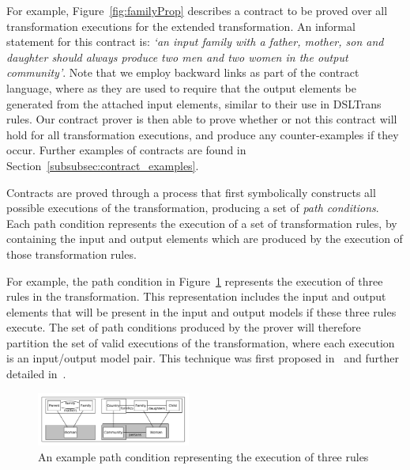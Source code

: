   For example, Figure~\ref{fig:familyProp} describes a contract to be proved over all transformation executions for the extended \FTP transformation. An informal statement for this contract is:
  \textit{`an input family with a father, mother, son and daughter should always produce
  two men and two women in the output community'}. Note that we employ backward links as part of the contract language, where as they are used to require that the output elements be
  generated from the attached input elements, similar to their use in DSLTrans rules. Our contract prover is then
  able to prove whether or not this contract will hold for all transformation executions, and produce any counter-examples if they occur. Further examples of contracts are found in Section~\ref{subsubsec:contract_examples}.


 Contracts are proved through a process that first symbolically constructs all
 possible executions of the transformation, producing a set of \emph{path conditions}. Each path condition represents the execution of a set of transformation rules, by containing the input and output elements which are produced by the execution of those transformation rules.

 For example, the path condition in Figure~\ref{fig:pc_first} represents the execution of three rules in the transformation. This representation includes the input and output elements that will be present in the input and output models if these three rules execute. The set of path conditions produced by the prover will therefore partition the set of valid executions of the transformation, where each execution is an input/output model pair. This technique was first proposed in~\cite{Lucio2010} and further detailed in~\cite{Lucio2014}.

   \begin{figure}[t]
     \begin{center}
       \includegraphics[width=0.45\textwidth]{figures/contract_proving/pc}
       \caption{An example path condition representing the execution of three rules}
       \label{fig:pc_first}
     \end{center}
     \vspace{-0.20in}
   \end{figure}



